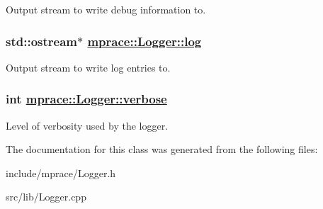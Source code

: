 Output stream to write debug information to. 

\hypertarget{classmprace_1_1Logger_p0}{
\subsubsection[log]{\setlength{\rightskip}{0pt plus 5cm}std::ostream$\ast$ \hyperlink{classmprace_1_1Logger_p0}{mprace::Logger::log}}}
\label{classmprace_1_1Logger_p0}


Output stream to write log entries to. 

\hypertarget{classmprace_1_1Logger_p2}{
\subsubsection[verbose]{\setlength{\rightskip}{0pt plus 5cm}int \hyperlink{classmprace_1_1Logger_p2}{mprace::Logger::verbose}}}
\label{classmprace_1_1Logger_p2}


Level of verbosity used by the logger. 



The documentation for this class was generated from the following files:\begin{CompactItemize}
\item 
include/mprace/Logger.h\item 
src/lib/Logger.cpp\end{CompactItemize}
